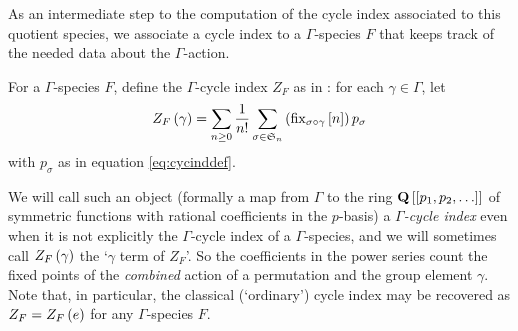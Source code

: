 \documentclass[sectionflow,singlespace,twoside,boldmathhdr]{brandiss} %
\numberwithin{section}{chapter}
\numberwithin{figure}{chapter}
\begin{document}
As an intermediate step to the computation of the cycle index associated to this quotient species, we associate a cycle index to a $\Gamma$-species $F$ that keeps track of the needed data about the $\Gamma$-action.
\begin{definition}
  \label{def:gcycind}
  For a $\Gamma$-species $F$, define the $\Gamma$-cycle index $Z_{F}$ as in \cite{hend:specfield}: for each $\gamma \in \Gamma$, let
  \begin{equation}
    Z_{F} \left( {\gamma} \right) = \sum_{n \geq 0} \frac{1}{n!} \sum_{\sigma \in \mathfrak{S}_{n}} \left( {\operatorname{fix}_{\sigma \circ \gamma} \left[ {n} \right]} \right) p_{\sigma} \label{eq:gcycinddef}
  \end{equation}
  with $p_{\sigma}$ as in equation \eqref{eq:cycinddef}.
\end{definition}

We will call such an object (formally a map from $\Gamma$ to the ring $\mathbf{Q} \left[ {\left[ {p_{1}, p_{2}, \dots} \right]} \right]$ of symmetric functions with rational coefficients in the $p$-basis) a \emph{$\Gamma$-cycle index} even when it is not explicitly the $\Gamma$-cycle index of a $\Gamma$-species, and we will sometimes call $Z_{F} \left( {\gamma} \right)$ the `$\gamma$ term of $Z_{F}$'.
So the coefficients in the power series count the fixed points of the \emph{combined} action of a permutation and the group element $\gamma$.
Note that, in particular, the classical (`ordinary') cycle index may be recovered as $Z_{F} = Z_{F} \left( {e} \right)$ for any $\Gamma$-species $F$.
\end{document}
